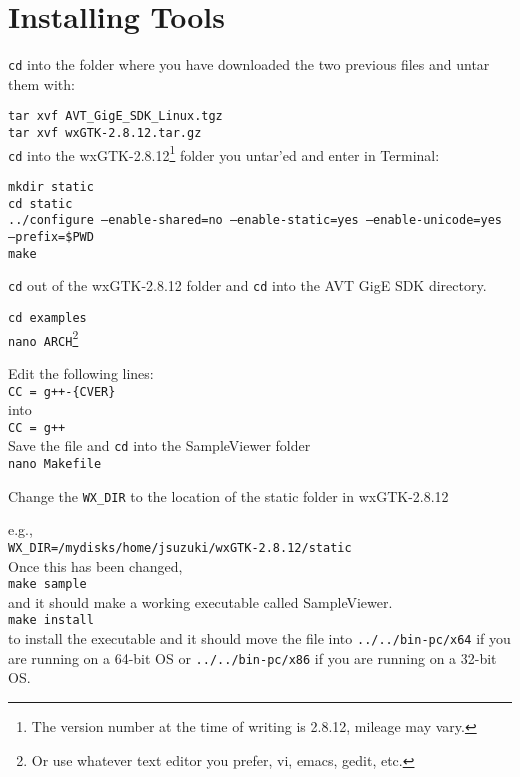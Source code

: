 \documentclass[10pt,a4paper]{article}
\begin{document}
\section{Installing Tools}

\texttt{cd} into the folder where you have downloaded the two previous files and untar them with:

\texttt{tar xvf AVT\_GigE\_SDK\_Linux.tgz\\
tar xvf wxGTK-2.8.12.tar.gz}\\


\texttt{cd} into the wxGTK-2.8.12\footnote{The version number at the time of writing is 2.8.12, mileage may vary.} folder you untar'ed and enter in Terminal:

\texttt{mkdir static \\
cd static \\
../configure --enable-shared=no --enable-static=yes --enable-unicode=yes --prefix=\$PWD\\
make
}

\texttt{cd} out of the wxGTK-2.8.12 folder and \texttt{cd} into the AVT GigE SDK directory.

\texttt{cd examples\\
nano ARCH}\footnote{Or use whatever text editor you prefer, vi, emacs, gedit, etc.}\\

\newpage

Edit the following lines:\\
\texttt{CC = g++-\{CVER\}}\\
into\\
\texttt{CC = g++}\\

Save the file and \texttt{cd} into the SampleViewer folder\\
\texttt{nano Makefile}

Change the \texttt{WX\_DIR} to the location of the static folder in wxGTK-2.8.12

e.g.,\\
\texttt{WX\_DIR=/mydisks/home/jsuzuki/wxGTK-2.8.12/static}\\

Once this has been changed,\\
\texttt{make sample}\\
and it should make a working executable called SampleViewer.\\
\texttt{make install}\\
to install the executable and it should move the file into \texttt{../../bin-pc/x64} if you are running on a 64-bit OS or  \texttt{../../bin-pc/x86} if you are running on a 32-bit OS.
\end{document}
